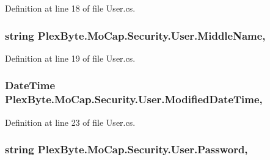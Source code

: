 Definition at line 18 of file User.\+cs.

\subsubsection[{\texorpdfstring{Middle\+Name}{MiddleName}}]{\setlength{\rightskip}{0pt plus 5cm}string Plex\+Byte.\+Mo\+Cap.\+Security.\+User.\+Middle\+Name\hspace{0.3cm}{\ttfamily [get]}, {\ttfamily [set]}}\hypertarget{class_plex_byte_1_1_mo_cap_1_1_security_1_1_user_af6fccb21254c949d6f58f9011e2a25c4}{}\label{class_plex_byte_1_1_mo_cap_1_1_security_1_1_user_af6fccb21254c949d6f58f9011e2a25c4}


Definition at line 19 of file User.\+cs.

\subsubsection[{\texorpdfstring{Modified\+Date\+Time}{ModifiedDateTime}}]{\setlength{\rightskip}{0pt plus 5cm}Date\+Time Plex\+Byte.\+Mo\+Cap.\+Security.\+User.\+Modified\+Date\+Time\hspace{0.3cm}{\ttfamily [get]}, {\ttfamily [set]}}\hypertarget{class_plex_byte_1_1_mo_cap_1_1_security_1_1_user_a412d3fe8c1013bd3ac76217717fe5814}{}\label{class_plex_byte_1_1_mo_cap_1_1_security_1_1_user_a412d3fe8c1013bd3ac76217717fe5814}


Definition at line 23 of file User.\+cs.

\subsubsection[{\texorpdfstring{Password}{Password}}]{\setlength{\rightskip}{0pt plus 5cm}string Plex\+Byte.\+Mo\+Cap.\+Security.\+User.\+Password\hspace{0.3cm}{\ttfamily [get]}, {\ttfamily [set]}}\hypertarget{class_plex_byte_1_1_mo_cap_1_1_security_1_1_user_aa83a2d092f69dabaafb5c8d5646fa4f9}{}\label{class_plex_byte_1_1_mo_cap_1_1_security_1_1_user_aa83a2d092f69dabaafb5c8d5646fa4f9}



